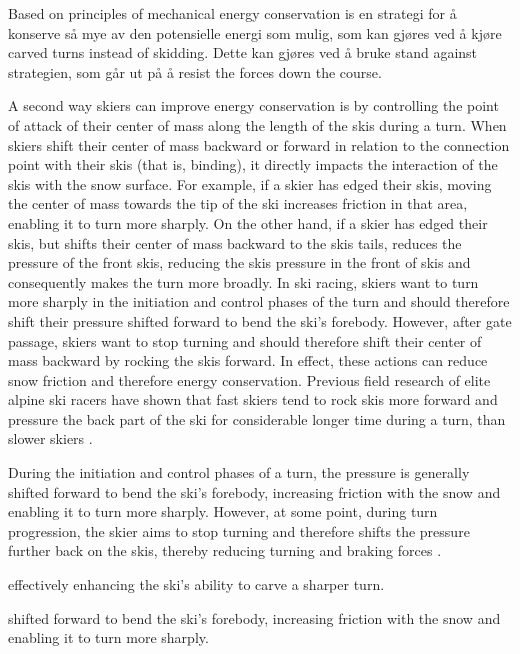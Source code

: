 \documentclass[letterpaper,10pt]{article}
\begin{document}
Based on principles of mechanical energy conservation is en strategi for å konserve så mye av den potensielle energi som mulig, som kan gjøres ved å kjøre carved turns instead of skidding. Dette kan gjøres ved å bruke stand against strategien, som går ut på å resist the forces down the course. 

A second way skiers can improve energy conservation is by controlling the point of attack of their center of mass along the length of the skis during a turn. When skiers shift their center of mass backward or forward in relation to the connection point with their skis (that is, binding), it directly impacts the interaction of the skis with the snow surface. For example, if a skier has edged their skis, moving the center of mass towards the tip of the ski increases friction in that area, enabling it to turn more sharply. On the other hand, if a skier has edged their skis, but shifts their center of mass backward to the skis tails, reduces the pressure of the front skis, reducing the skis pressure in the front of skis and consequently makes the turn more broadly. In ski racing, skiers want to turn more sharply in the initiation and control phases of the turn and should therefore shift their pressure shifted forward to bend the ski's forebody. However, after gate passage, skiers want to stop turning and should therefore shift their center of mass backward by rocking the skis forward. In effect, these actions can reduce snow friction and therefore energy conservation. Previous field research of elite alpine ski racers have shown that fast skiers tend to rock skis more forward and pressure the back part of the ski for considerable longer time during a turn, than slower skiers \cite{reid_kinematic_2010, tjorhom_beskrivelse_2007, reid_alpine_2020}. 

During the initiation and control phases of a turn, the pressure is generally shifted forward to bend the ski's forebody, increasing friction with the snow and enabling it to turn more sharply. However, at some point, during turn progression, the skier aims to stop turning and therefore shifts the pressure further back on the skis, thereby reducing turning and braking forces \cite{lemaster_skiers_1999, lemaster_ultimate_2010}. 

effectively enhancing the ski's ability to carve a sharper turn. 


shifted forward to bend the ski's forebody, increasing friction with the snow and enabling it to turn more sharply. 
\end{document}
